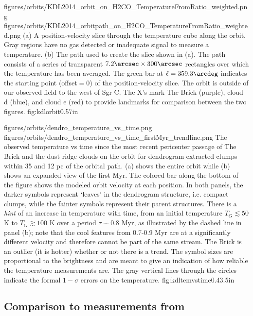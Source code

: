 \RotFigureTwoAA
{figures/orbits/KDL2014_orbit_on_H2CO_TemperatureFromRatio_weighted.png}
{figures/orbits/KDL2014_orbitpath_on_H2CO_TemperatureFromRatio_weighted.png}
{(a) A position-velocity slice through the temperature cube along the
\citet{Kruijssen2015a} orbit.  
Gray regions have no gas detected or inadequate signal to measure a
temperature.
(b) The path used to create the slice shown in (a).  The path consists of a series
of transparent $7.2\arcsec\times300\arcsec$
rectangles over which the temperature has been averaged.  The green bar at
$\ell=359.3\arcdeg$ indicates the starting point (offset$=0$) of the position-velocity
slice.  The orbit is outside of our observed field to the west of Sgr C.  
The X's mark The Brick (purple), cloud d (blue), and cloud e (red) to provide
landmarks for comparison between the two figures.
}
{fig:kdlorbit}{0.5}{7in}

\FigureTwo
{figures/orbits/dendro_temperature_vs_time.png}
{figures/orbits/dendro_temperature_vs_time_firstMyr_trendline.png}
{The observed temperature vs time since the most recent pericenter passage of
The Brick and the dust ridge clouds on the \citet{Kruijssen2015a} orbit for
dendrogram-extracted clumps within 35 \kms and 12 pc of the orbital path.  
(a) shows the entire orbit
while (b) shows an expanded
view of the first Myr.  The colored bar along the bottom of the figure shows the
modeled orbit velocity at each position.
In both panels,
the darker symbols represent `leaves'
in the dendrogram structure, i.e. compact clumps, while the fainter symbols
represent their parent structures. There is a \emph{hint} of an 
increase in temperature with time, from an initial temperature $T_G\lesssim50$ K
to $T_G\gtrsim100$ K over a period $\tau\sim0.8$ Myr, as illustrated by the
dashed line in panel (b); note that the cool features from 0.7-0.9 Myr are
at a significantly different velocity and therefore cannot be part of the same
stream.  The Brick is an outlier (it is hotter) whether or not there is a
trend.  The symbol sizes are proportional to the \para \threetwoone brightness
and are meant to give
an indication of how reliable the temperature measurements are.  The gray
vertical lines through the circles indicate the formal $1-\sigma$ errors on the
temperature.
}
{fig:kdltemvstime}{0.4}{3.5in}

\subsection{Comparison to \ammonia measurements from \citet{Ott2014a}}
\label{sec:ammoniacompare}

